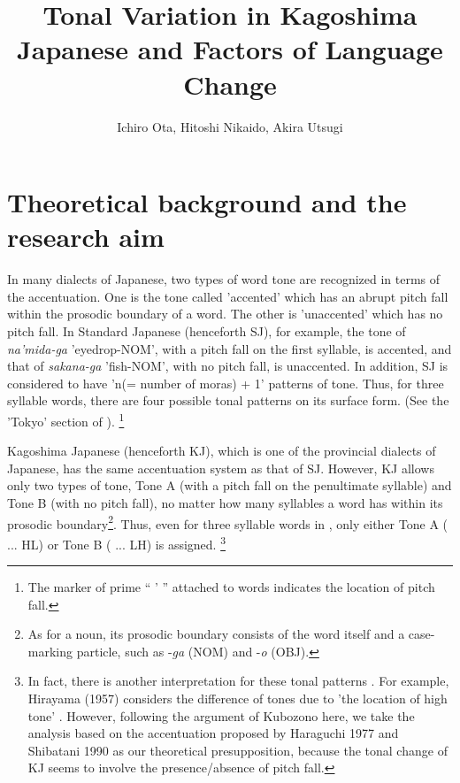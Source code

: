 \documentclass[output=paper]{LSP/langsci}
\author{Ichiro Ota, Hitoshi Nikaido, Akira Utsugi}
\title{Tonal Variation in Kagoshima Japanese and Factors of Language Change}
\begin{document}
 

\section{Theoretical background and the research aim}
     In many dialects of Japanese, two types of word tone are recognized in terms of the accentuation. One is the tone called 'accented' which has an abrupt pitch fall within the prosodic boundary of a word. The other is 'unaccented' which has no pitch fall.  In Standard Japanese (henceforth SJ), for example, the tone of \textit{na'mida-ga} 'eyedrop-NOM', with a pitch fall on the first syllable, is accented, and that of \textit{sakana-ga} 'fish-NOM', with no pitch fall, is unaccented. In addition, SJ is considered to have 'n(= number of moras) + 1' patterns of tone. Thus, for three syllable words, there are four possible tonal patterns on its surface form. (See the 'Tokyo' section of ). \footnote{ The marker of prime “ ’ ” attached to words indicates the location of pitch fall.}

     Kagoshima Japanese (henceforth KJ), which is one of the provincial dialects of Japanese, has the same accentuation system as that of SJ. However, KJ allows only two types of tone, Tone A (with a pitch fall on the penultimate syllable) and Tone B (with no pitch fall), no matter how many syllables a word has within its prosodic boundary\footnote{ As for a noun, its prosodic boundary consists of the word itself and a case-marking particle, such as -\textit{ga} (NOM) and -\textit{o} (OBJ).}. Thus, even for three syllable words in , only either Tone A ( ... HL) or Tone B ( ... LH) is assigned. \footnote{ In fact, there is another interpretation for these tonal patterns \citep{kubozono_tonal_2007}. For example, Hirayama (1957) %
considers the difference of tones due to 'the location of high tone' \citep[327]{kubozono_tonal_2007}. However, following the argument of Kubozono here,  we take the analysis based on the accentuation proposed by Haraguchi 1977 and Shibatani 1990 %
as our theoretical presupposition, because the tonal change of KJ seems to involve the presence/absence of pitch fall.  
} 
 
\end{document}
